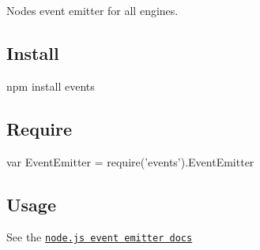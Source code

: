 Node\textquotesingle{}s event emitter for all engines.

\subsection*{Install}


\begin{DoxyCode}
npm install events
\end{DoxyCode}


\subsection*{Require}


\begin{DoxyCode}
var EventEmitter = require('events').EventEmitter
\end{DoxyCode}


\subsection*{Usage}

See the \href{http://nodejs.org/api/events.html}{\tt node.\+js event emitter docs} 
